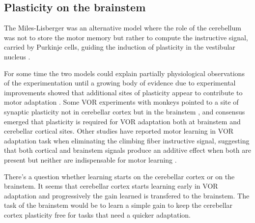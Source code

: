 \documentclass[12pt, a4paper,twoside]{tesi_upf}
\begin{document}
\begin{appendices}
\section{Plasticity on the brainstem}

The Miles-Lisberger was an alternative model where the role of the cerebellum was not to store the motor memory but rather to compute the instructive signal, carried by Purkinje cells, guiding the induction of plasticity in the vestibular nucleus \cite{Lac1995}.

For some time the two models could explain partially physiological observations of the experimentation until a growing body of evidence due to experimental improvements showed that additional sites of plasticity appear to contribute to motor adaptation \cite{Gao2012a}. Some VOR experiments with monkeys pointed to a site of synaptic plasticity not in cerebellar cortex but in the brainstem \cite{Lisberger2009a}, and consensus emerged that plasticity is required for VOR adaptation both at brainstem and cerebellar cortical sites. Other studies have reported motor learning in VOR adaptation task when eliminating the climbing fiber instructive signal, suggesting that both cortical and brainstem signals produce an additive effect when both are present but neither are indispensable for motor learning \cite{Ke2009a}.

There's a question whether learning starts on the cerebellar cortex or on the brainstem. It seems that cerebellar cortex starts learning early in VOR adaptation and progressively the gain learned is transfered to the brainstem. The task of the brainstem would be to learn a simple gain to keep the cerebellar cortex plasticity free for tasks that need a quicker adaptation.

%

\end{appendices}



\backmatter
\end{document}
